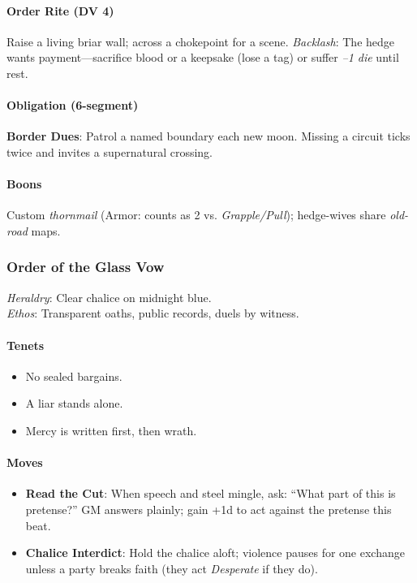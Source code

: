 \documentclass[11pt,letterpaper]{article}
\begin{document}
\paragraph{Order Rite (DV 4)}  
Raise a living briar wall;  across a chokepoint for a scene. \textit{Backlash}: The hedge wants payment---sacrifice blood or a keepsake (lose a tag) or suffer \textit{--1 die} until rest.

\paragraph{Obligation (6-segment)}
\textbf{Border Dues}: Patrol a named boundary each new moon. Missing a circuit ticks twice and invites a supernatural crossing.

\paragraph{Boons}
Custom \textit{thornmail} (Armor: counts as 2 vs. \textit{Grapple/Pull}); hedge-wives share \textit{old-road} maps.

\bigskip

\subsubsection{Order of the Glass Vow}
\textit{Heraldry}: Clear chalice on midnight blue.\\
\textit{Ethos}: Transparent oaths, public records, duels by witness.

\paragraph{Tenets}
\begin{itemize}[leftmargin=*]
\item No sealed bargains.
\item A liar stands alone.
\item Mercy is written first, then wrath.
\end{itemize}

\paragraph{Moves}
\begin{itemize}[leftmargin=*]
\item \textbf{Read the Cut}: When speech and steel mingle, ask: ``What part of this is pretense?'' GM answers plainly; gain +1d to act against the pretense this beat.
\item \textbf{Chalice Interdict}: Hold the chalice aloft; violence pauses for one exchange unless a party breaks faith (they act \textit{Desperate} if they do).
\end{itemize}
\end{document}
